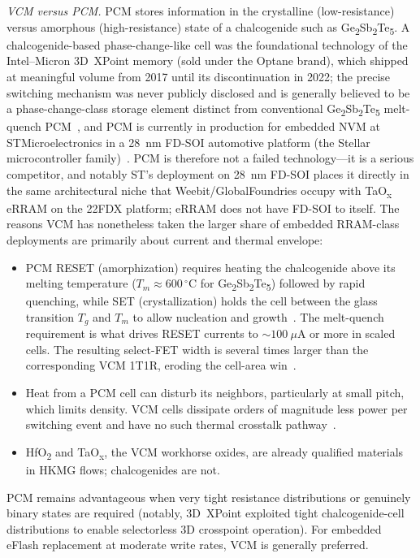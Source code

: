 \documentclass[lettersize,journal]{IEEEtran}
\begin{document}
\textit{VCM versus PCM.} PCM stores information in the crystalline (low-resistance) versus amorphous (high-resistance) state of a chalcogenide such as Ge\textsubscript{2}Sb\textsubscript{2}Te\textsubscript{5}. A chalcogenide-based phase-change-like cell was the foundational technology of the Intel--Micron 3D~XPoint memory (sold under the Optane brand), which shipped at meaningful volume from 2017 until its discontinuation in 2022; the precise switching mechanism was never publicly disclosed and is generally believed to be a phase-change-class storage element distinct from conventional Ge\textsubscript{2}Sb\textsubscript{2}Te\textsubscript{5} melt-quench PCM~\cite{ref_hellenbrand2024}, and PCM is currently in production for embedded NVM at STMicroelectronics in a 28~nm FD-SOI automotive platform (the Stellar microcontroller family)~\cite{ref_hellenbrand2024}. PCM is therefore not a failed technology---it is a serious competitor, and notably ST's deployment on 28~nm FD-SOI places it directly in the same architectural niche that Weebit/GlobalFoundries occupy with TaO\textsubscript{x} eRRAM on the 22FDX platform; eRRAM does not have FD-SOI to itself. The reasons VCM has nonetheless taken the larger share of embedded RRAM-class deployments are primarily about current and thermal envelope:
\begin{itemize}
\item PCM RESET (amorphization) requires heating the chalcogenide above its melting temperature ($T_m\!\approx\!600\,^\circ$C for Ge\textsubscript{2}Sb\textsubscript{2}Te\textsubscript{5}) followed by rapid quenching, while SET (crystallization) holds the cell between the glass transition $T_g$ and $T_m$ to allow nucleation and growth~\cite{ref_raoux2014}. The melt-quench requirement is what drives RESET currents to ${\sim}100~\mu$A or more in scaled cells. The resulting select-FET width is several times larger than the corresponding VCM 1T1R, eroding the cell-area win~\cite{ref_hellenbrand2024,ref_wong2012}.
\item Heat from a PCM cell can disturb its neighbors, particularly at small pitch, which limits density. VCM cells dissipate orders of magnitude less power per switching event and have no such thermal crosstalk pathway~\cite{ref_ielmini2016}.
\item HfO\textsubscript{2} and TaO\textsubscript{x}, the VCM workhorse oxides, are already qualified materials in HKMG flows; chalcogenides are not.
\end{itemize}
PCM remains advantageous when very tight resistance distributions or genuinely binary states are required (notably, 3D~XPoint exploited tight chalcogenide-cell distributions to enable selectorless 3D crosspoint operation). For embedded eFlash replacement at moderate write rates, VCM is generally preferred.
\end{document}

